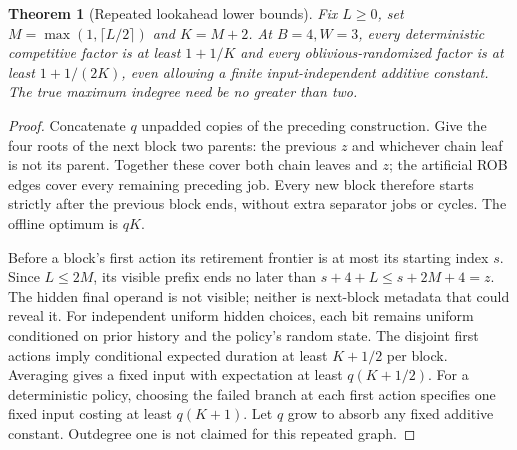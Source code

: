 \documentclass[11pt]{article}
\newtheorem{theorem}{Theorem}
\begin{document}
\begin{theorem}[Repeated lookahead lower bounds]
Fix $L\ge0$, set $M=\max(1,\lceil L/2\rceil)$ and $K=M+2$.
At $B=4,W=3$, every deterministic competitive factor is at least
$1+1/K$ and every oblivious-randomized factor is at least $1+1/(2K)$,
even allowing a finite input-independent additive constant. The true
maximum indegree need be no greater than two.
\end{theorem}
\begin{proof}
Concatenate $q$ unpadded copies of the preceding construction. Give the
four roots of the next block two parents: the previous $z$ and whichever
chain leaf is not its parent. Together these cover both chain leaves and
$z$; the artificial ROB edges cover every remaining preceding job.
Every new block therefore starts strictly after the previous block ends,
without extra separator jobs or cycles. The offline optimum is $qK$.

Before a block's first action its retirement frontier is at most its
starting index $s$. Since $L\le2M$, its visible prefix ends no later
than $s+4+L\le s+2M+4=z$. The hidden final operand is not visible;
neither is next-block metadata that could reveal it. For independent
uniform hidden choices, each bit remains uniform conditioned on prior
history and the policy's random state. The disjoint first actions imply
conditional expected duration at least $K+1/2$ per block. Averaging gives
a fixed input with expectation at least $q(K+1/2)$. For a deterministic
policy, choosing the failed branch at each first action specifies one
fixed input costing at least $q(K+1)$. Let $q$ grow to absorb any fixed
additive constant. Outdegree one is not claimed for this repeated graph.
\end{proof}
\end{document}
